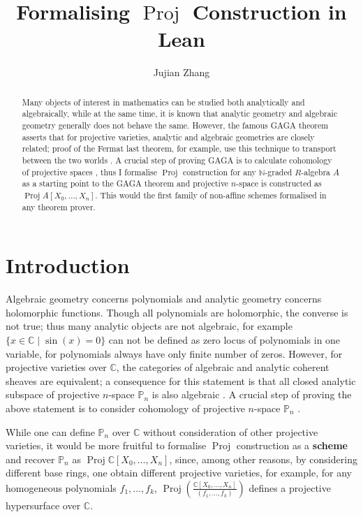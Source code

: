 \documentclass[a4paper,UKenglish,cleveref, autoref, thm-restate]{lipics-v2021}
\title{Formalising $\operatorname{Proj}$ Construction in Lean} %
\author{Jujian Zhang}{Department of Mathematics, Imperial College London \and \url{https://www.imperial.ac.uk/}}{jujian.zhang19@imperial.ac.uk}{https://orcid.org/0000-0001-7340-2703}{Schr\"odinger Scholarship Scheme}
\begin{document}
\maketitle

\begin{abstract}
    Many objects of interest in mathematics can be studied both analytically and algebraically, while at the same time, it is known that analytic geometry and algebraic geometry generally does not behave the same. However, the famous GAGA theorem asserts that for projective varieties, analytic and algebraic geometries are closely related; proof of the Fermat last theorem, for example, use this technique to transport between the two worlds \cite{serre1955geometrie}. A crucial step of proving GAGA is to calculate cohomology of projective spaces \cite{neeman2007algebraic}, thus I formalise $\operatorname{Proj}$ construction for any $\mathbb{N}$-graded $R$-algebra $A$ as a starting point to the GAGA theorem and projective $n$-space is constructed as $\operatorname{Proj} A[X_0,\dots, X_n]$. This would the first family of non-affine schemes formalised in any theorem prover.
\end{abstract}

\section{Introduction}
Algebraic geometry concerns polynomials and analytic geometry concerns holomorphic functions. Though all polynomials are holomorphic, the converse is not true; thus many analytic objects are not algebraic, for example $\{x \in \mathbb{C} \mid \sin(x) = 0\}$ can not be defined as zero locus of polynomials in one variable, for polynomials always have only finite number of zeros. However, for projective varieties over $\mathbb{C}$, the categories of algebraic and analytic coherent sheaves are equivalent; a  consequence for this statement is that all closed analytic subspace of projective $n$-space $\mathbb{P}_n$ is also algebraic \cite{serre1955geometrie,chowtheorem}. A crucial step of proving the above statement is to consider cohomology of projective $n$-space $\mathbb{P}_n$  \cite{neeman2007algebraic}. 

While one can define $\mathbb{P}_n$ over $\mathbb{C}$ without consideration of other projective varieties, it would be more fruitful to formalise $\operatorname{Proj}$ construction as a \textbf{scheme} and recover $\mathbb{P}_n$ as $\operatorname{Proj} \mathbb{C}[X_0,\dots, X_n]$, since, among other reasons, by considering different base rings, one obtain different projective varieties, for example, for any homogeneous polynomials $f_1,\dots, f_k$, $\operatorname{Proj}\left(\frac{\mathbb{C}[X_0,\dots,X_n]}{(f_1,\dots,f_k)}\right)$ defines a projective hypersurface over $\mathbb{C}$.
\end{document}
